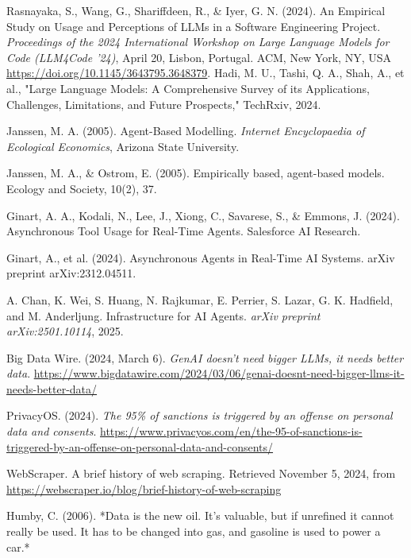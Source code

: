\begin{thebibliography}{1}
Rasnayaka, S., Wang, G., Shariffdeen, R., \& Iyer, G. N. (2024). An Empirical Study on Usage and Perceptions of LLMs in a Software Engineering Project. \textit{Proceedings of the 2024 International Workshop on Large Language Models for Code (LLM4Code ’24)}, April 20, Lisbon, Portugal. ACM, New York, NY, USA \url{https://doi.org/10.1145/3643795.3648379}.
 Hadi, M. U., Tashi, Q. A., Shah, A., et al., "Large Language Models: A Comprehensive Survey of its Applications, Challenges, Limitations, and Future Prospects," TechRxiv, 2024.

 Janssen, M. A. (2005). Agent-Based Modelling. \textit{Internet Encyclopaedia of Ecological Economics}, Arizona State University.

 Janssen, M. A., \& Ostrom, E. (2005). Empirically based, agent-based models. Ecology and Society, 10(2), 37.



 Ginart, A. A., Kodali, N., Lee, J., Xiong, C., Savarese, S., \& Emmons, J. (2024). Asynchronous Tool Usage for Real-Time Agents. Salesforce AI Research.



 Ginart, A., et al. (2024). Asynchronous Agents in Real-Time AI Systems. arXiv preprint arXiv:2312.04511.

A. Chan, K. Wei, S. Huang, N. Rajkumar, E. Perrier, S. Lazar, G. K. Hadfield, and M. Anderljung.
\newblock Infrastructure for AI Agents.
\newblock \emph{arXiv preprint arXiv:2501.10114}, 2025.

Big Data Wire. (2024, March 6). \textit{GenAI doesn’t need bigger LLMs, it needs better data}. \url{https://www.bigdatawire.com/2024/03/06/genai-doesnt-need-bigger-llms-it-needs-better-data/}

PrivacyOS. (2024). \textit{The 95\% of sanctions is triggered by an offense on personal data and consents}. \url{https://www.privacyos.com/en/the-95-of-sanctions-is-triggered-by-an-offense-on-personal-data-and-consents/}

WebScraper. A brief history of web scraping. Retrieved November 5, 2024, from \url{https://webscraper.io/blog/brief-history-of-web-scraping}

Humby, C. (2006). *Data is the new oil. It's valuable, but if unrefined it cannot really be used. It has to be changed into gas, and gasoline is used to power a car.*


\end{thebibliography}
